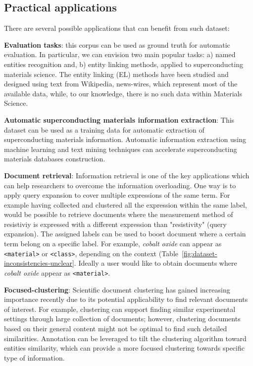 \documentclass[fleqn,10pt]{wlscirep}
\begin{document}
\subsection*{Practical applications}
There are several possible applications that can benefit from such dataset:

\textbf{Evaluation tasks}: this corpus can be used as ground truth for automatic evaluation. In particular, we can envision two main popular tasks: a) named entities recognition  and, b) entity linking methods, applied to superconducting materials science.
The entity linking (EL) methods have been studied and designed using text from Wikipedia, news-wires, which represent most of the available data, while, to our knowledge, there is no such data within Materials Science.

\textbf{Automatic superconducting materials information extraction}: This dataset can be used as a training data for automatic extraction of superconducting materials information. Automatic information extraction using machine learning and text mining techniques can accelerate superconducting materials databases construction.

\textbf{Document retrieval}: Information retrieval is one of the key applications which can help researchers to overcome the information overloading.
One way is to apply query expansion to cover multiple expressions of the same term. 
For example having collected and clustered all the expression within the same label, would be possible to retrieve documents where the measurement method of resistiviy is expressed with a different expression than "resistivity" (query expansion).
The assigned labels can be used to boost document where a certain term belong on a specific label. For example, \textit{cobalt oxide} can appear as \texttt{<material>} or \texttt{<class>}, depending on the context (Table~\ref{fig:dataset-inconsistencies-unclear}. Ideally a user would like to obtain documents where \textit{cobalt oxide} appear as \texttt{<material>}.

\textbf{Focused-clustering}: Scientific document clustering has gained increasing importance recently due to its potential applicability to find relevant documents of interest. 
For example, clustering can support finding similar experimental settings through large collection of documents; however, clustering documents based on their general content might not be optimal to find such detailed similarities. 
Annotation can be leveraged to tilt the clustering algorithm toward entities similarity, which can provide a more focused clustering towards specific type of information.
\end{document}
